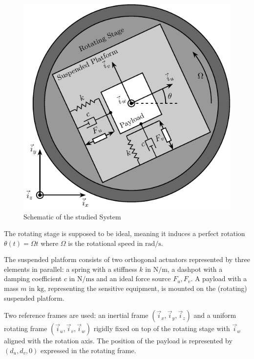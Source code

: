 \documentclass[Afour,sagev,times]{sagej}
\begin{document}
\begin{figure}[htbp]
\centering
\includegraphics[width=0.8\linewidth]{figs/system.pdf}
\caption{\label{fig:system}Schematic of the studied System}
\end{figure}

The rotating stage is supposed to be ideal, meaning it induces a perfect rotation \(\theta(t) = \Omega t\) where \(\Omega\) is the rotational speed in \(\si{\radian\per\second}\).

The suspended platform consists of two orthogonal actuators represented by three elements in parallel: a spring with a stiffness \(k\) in \(\si{\newton\per\meter}\), a dashpot with a damping coefficient \(c\) in \(\si{\newton\per\meter\second}\) and an ideal force source \(F_u, F_v\).
A payload with a mass \(m\) in \(\si{\kilo\gram}\), representing the sensitive equipment, is mounted on the (rotating) suspended platform.

Two reference frames are used: an inertial frame \((\vec{i}_x, \vec{i}_y, \vec{i}_z)\) and a uniform rotating frame \((\vec{i}_u, \vec{i}_v, \vec{i}_w)\) rigidly fixed on top of the rotating stage with \(\vec{i}_w\) aligned with the rotation axis.
The position of the payload is represented by \((d_u, d_v, 0)\) expressed in the rotating frame.
\end{document}
